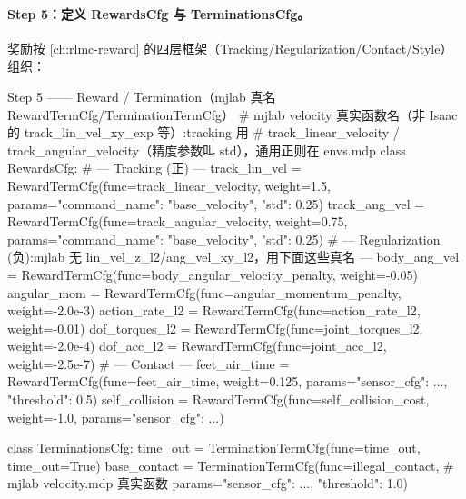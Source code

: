 
\paragraph{Step 5：定义 RewardsCfg 与 TerminationsCfg。}奖励按 \cref{ch:rlmc-reward} 的四层框架（Tracking/Regularization/Contact/Style）组织：

\begin{codebox}[Python]{Step 5 —— Reward / Termination（mjlab 真名 RewardTermCfg/TerminationTermCfg）}
# mjlab velocity 真实函数名（非 Isaac 的 track_lin_vel_xy_exp 等）:tracking 用
#   track_linear_velocity / track_angular_velocity（精度参数叫 std），通用正则在 envs.mdp
class RewardsCfg:
    # --- Tracking (正) ---
    track_lin_vel = RewardTermCfg(func=track_linear_velocity, weight=1.5,
                             params={"command_name": "base_velocity", "std": 0.25})
    track_ang_vel = RewardTermCfg(func=track_angular_velocity, weight=0.75,
                             params={"command_name": "base_velocity", "std": 0.25})
    # --- Regularization (负):mjlab 无 lin_vel_z_l2/ang_vel_xy_l2，用下面这些真名 ---
    body_ang_vel   = RewardTermCfg(func=body_angular_velocity_penalty, weight=-0.05)
    angular_mom    = RewardTermCfg(func=angular_momentum_penalty,      weight=-2.0e-3)
    action_rate_l2 = RewardTermCfg(func=action_rate_l2,   weight=-0.01)
    dof_torques_l2 = RewardTermCfg(func=joint_torques_l2, weight=-2.0e-4)
    dof_acc_l2     = RewardTermCfg(func=joint_acc_l2,     weight=-2.5e-7)
    # --- Contact ---
    feet_air_time   = RewardTermCfg(func=feet_air_time, weight=0.125,
                                    params={"sensor_cfg": ..., "threshold": 0.5})
    self_collision  = RewardTermCfg(func=self_collision_cost, weight=-1.0,
                                    params={"sensor_cfg": ...})

class TerminationsCfg:
    time_out     = TerminationTermCfg(func=time_out, time_out=True)
    base_contact = TerminationTermCfg(func=illegal_contact,   # mjlab velocity.mdp 真实函数
                            params={"sensor_cfg": ..., "threshold": 1.0})
\end{codebox}


